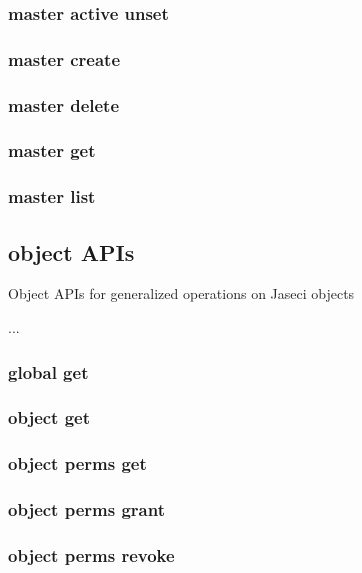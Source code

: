 \subsubsection{master active unset}

\subsubsection{master create}

\subsubsection{master delete}

\subsubsection{master get}

\subsubsection{master list}

\subsection{object APIs}

Object APIs for generalized operations on Jaseci objects
\par
...

\subsubsection{global get}

\subsubsection{object get}

\subsubsection{object perms get}

\subsubsection{object perms grant}

\subsubsection{object perms revoke}

